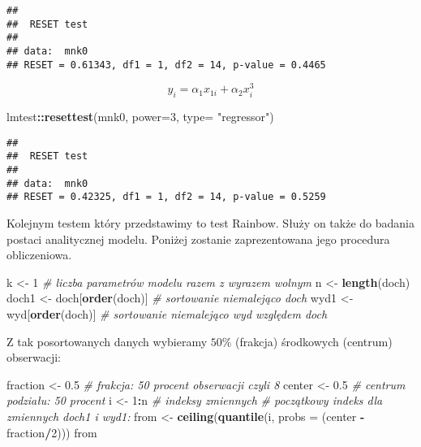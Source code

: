 \documentclass[polish,]{book}
\newenvironment{Shaded}{\begin{snugshade}}{\end{snugshade}}
\newcommand{\CommentTok}[1]{\textcolor[rgb]{0.56,0.35,0.01}{\textit{#1}}}
\newcommand{\DataTypeTok}[1]{\textcolor[rgb]{0.13,0.29,0.53}{#1}}
\newcommand{\DecValTok}[1]{\textcolor[rgb]{0.00,0.00,0.81}{#1}}
\newcommand{\FloatTok}[1]{\textcolor[rgb]{0.00,0.00,0.81}{#1}}
\newcommand{\KeywordTok}[1]{\textcolor[rgb]{0.13,0.29,0.53}{\textbf{#1}}}
\newcommand{\NormalTok}[1]{#1}
\newcommand{\OperatorTok}[1]{\textcolor[rgb]{0.81,0.36,0.00}{\textbf{#1}}}
\newcommand{\StringTok}[1]{\textcolor[rgb]{0.31,0.60,0.02}{#1}}
\begin{document}
\begin{verbatim}
## 
##  RESET test
## 
## data:  mnk0
## RESET = 0.61343, df1 = 1, df2 = 14, p-value = 0.4465
\end{verbatim}

\begin{equation}
y_i=\alpha_1x_{1i}+\alpha_2x^3_i
\label{eq:wz137}
\end{equation}

\begin{Shaded}
\begin{Highlighting}[]
\NormalTok{lmtest}\OperatorTok{::}\KeywordTok{resettest}\NormalTok{(mnk0, }\DataTypeTok{power=}\DecValTok{3}\NormalTok{, }\DataTypeTok{type=} \StringTok{"regressor"}\NormalTok{)}
\end{Highlighting}
\end{Shaded}

\begin{verbatim}
## 
##  RESET test
## 
## data:  mnk0
## RESET = 0.42325, df1 = 1, df2 = 14, p-value = 0.5259
\end{verbatim}

Kolejnym testem który przedstawimy to test Rainbow. Służy on także do badania postaci analitycznej modelu. Poniżej zostanie zaprezentowana jego procedura
obliczeniowa.

\begin{Shaded}
\begin{Highlighting}[]
\NormalTok{k <-}\StringTok{ }\DecValTok{1} \CommentTok{# liczba parametrów modelu razem z wyrazem wolnym}
\NormalTok{n <-}\StringTok{ }\KeywordTok{length}\NormalTok{(doch)}
\NormalTok{doch1 <-}\StringTok{ }\NormalTok{doch[}\KeywordTok{order}\NormalTok{(doch)] }\CommentTok{# sortowanie niemalejąco doch}
\NormalTok{wyd1 <-}\StringTok{ }\NormalTok{wyd[}\KeywordTok{order}\NormalTok{(doch)]  }\CommentTok{# sortowanie niemalejąco wyd względem doch}
\end{Highlighting}
\end{Shaded}

Z tak posortowanych danych wybieramy \(50\%\) (frakcja) środkowych (centrum) obserwacji:

\begin{Shaded}
\begin{Highlighting}[]
\NormalTok{fraction <-}\StringTok{ }\FloatTok{0.5} \CommentTok{# frakcja: 50 procent obserwacji czyli 8}
\NormalTok{center <-}\StringTok{ }\FloatTok{0.5}   \CommentTok{# centrum podziału: 50 procent}
\NormalTok{i <-}\StringTok{ }\DecValTok{1}\OperatorTok{:}\NormalTok{n        }\CommentTok{# indeksy zmiennych}
\CommentTok{# początkowy indeks dla zmiennych doch1 i wyd1:}
\NormalTok{from <-}\StringTok{ }\KeywordTok{ceiling}\NormalTok{(}\KeywordTok{quantile}\NormalTok{(i, }\DataTypeTok{probs =}\NormalTok{ (center }\OperatorTok{-}\StringTok{ }\NormalTok{fraction}\OperatorTok{/}\DecValTok{2}\NormalTok{)))}
\NormalTok{from}
\end{Highlighting}
\end{Shaded}
\end{document}
